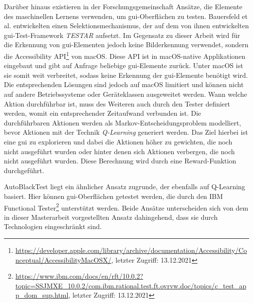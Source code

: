 Darüber hinaus existieren in der Forschungsgemeinschaft Ansätze, die Elemente des maschinellen Lernens verwenden, um \gls{gui}-Oberflächen zu testen.
Bauersfeld et al. \cite{bauersfeldUserInterfaceLevel} entwickelten einen Selektionsmechanismus, der auf dem von ihnen entwickelten \gls{gui}-Test-Framework \emph{TESTAR} \cite{bauersfeldGUITestJavaLibrary2012} aufsetzt. Im Gegensatz zu dieser Arbeit wird für die Erkennung von \gls{gui}-Elementen jedoch keine Bilderkennung verwendet, sondern die Accessibility API\footnote{\url{https://developer.apple.com/library/archive/documentation/Accessibility/Conceptual/AccessibilityMacOSX/}, letzter Zugriff: 13.12.2021} von macOS. Diese API ist in macOS-native Applikationen eingebaut und gibt auf Anfrage beliebige \gls{gui}-Elemente zurück. Unter macOS ist sie somit weit verbreitet, sodass keine Erkennung der \gls{gui}-Elemente benötigt wird. Die entsprechenden Lösungen sind jedoch auf macOS limitiert und können nicht auf andere Betriebssysteme oder Geräteklassen ausgeweitet werden. Wann welche Aktion durchführbar ist, muss des Weiteren auch durch den Tester definiert werden, womit ein entsprechender Zeitaufwand verbunden ist. Die durchführbaren Aktionen werden als Markov-Entscheidungsproblem modelliert, bevor Aktionen mit der Technik \emph{Q-Learning} generiert werden. Das Ziel hierbei ist eine \gls{gui} zu explorieren und dabei die Aktionen höher zu gewichten, die noch nicht ausgeführt wurden oder hinter denen sich Aktionen verbergen, die noch nicht ausgeführt wurden. Diese Berechnung wird durch eine Reward-Funktion durchgeführt.

AutoBlackTest \cite{marianiAutoBlackTestAutomaticBlackBox2012} liegt ein ähnlicher Ansatz zugrunde, der ebenfalls auf Q-Learning basiert. Hier können \gls{gui}-Oberflächen getestet werden, die durch den IBM Functional Tester\footnote{\url{https://www.ibm.com/docs/en/rft/10.0.2?topic=SSJMXE_10.0.2/com.ibm.rational.test.ft.ovrvw.doc/topics/c_test_app_dom_sup.html}, letzter Zugriff: 13.12.2021} unterstützt werden. Beide Ansätze unterscheiden sich von dem in dieser Masterarbeit vorgestellten Ansatz dahingehend, dass sie durch Technologien eingeschränkt sind.


